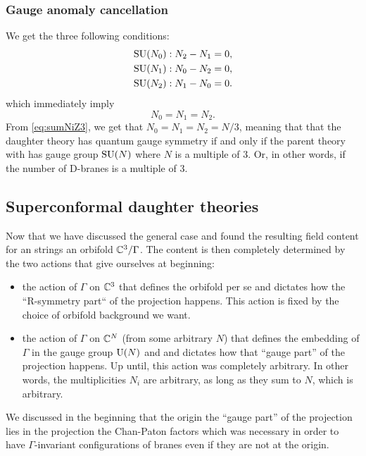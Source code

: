         \subsubsection{Gauge anomaly cancellation}
        
            We get the three following conditions:
            \begin{align}
                \text{SU}(N_0) &: N_2-N_1 = 0,\\
                \text{SU}(N_1) &: N_0-N_2 = 0,\\
                \text{SU}(N_2) &: N_1-N_0 = 0.
            \end{align}
            which immediately imply
            \begin{equation}
                N_0=N_1=N_2.
            \end{equation}
            From \eqref{eq:sumNiZ3}, we get that $N_0=N_1=N_2=N/3$, meaning that that the daughter theory has quantum gauge symmetry if and only if the parent theory with has gauge group $\text{SU}(N)$ where $N$ is a multiple of $3$. Or, in other words, if the number of D-branes is a multiple of $3$.

    \subsection{Superconformal daughter theories}

        Now that we have discussed the general case and found the resulting field content for an strings an orbifold $\mathbb{C}^3/\Gamma$. The content is then completely determined by the two actions that give ourselves at beginning: 
        \begin{itemize}
            \item the action of $\Gamma$ on $\mathbb{C}^3$ that defines the orbifold per se and dictates how the ``R-symmetry part`` of the projection happens. This action is fixed by the choice of orbifold background we want.
            \item the action of $\Gamma$ on $\mathbb{C}^N$ (from some arbitrary $N$) that defines the embedding of $\Gamma$ in the gauge group $\text{U}(N)$ and and dictates how that ``gauge part'' of the projection happens. Up until, this action was completely arbitrary. In other words, the multiplicities $N_i$ are arbitrary, as long as they sum to $N$, which is arbitrary.
        \end{itemize}
        We discussed in the beginning that the origin the ``gauge part'' of the projection lies in the projection the Chan-Paton factors which was necessary in order to have $\Gamma$-invariant configurations of branes even if they are not at the origin. 
        
